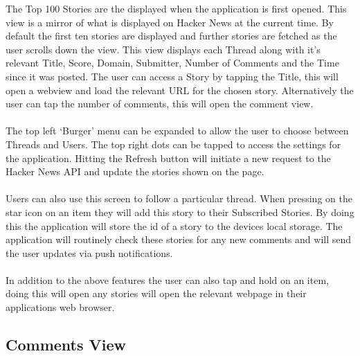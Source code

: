 \documentclass[11pt]{article}
\begin{document}
The Top 100 Stories are the displayed when the application is first opened. This view is a mirror of what is displayed on Hacker News at the current time. By default the first ten stories are displayed and further stories are fetched as the user scrolls down the view. This view displays each Thread along with it’s relevant Title, Score, Domain, Submitter, Number of Comments and the Time since it was posted. The user can access a Story by tapping the Title, this will open a webview and load the relevant URL for the chosen story. Alternatively the user can tap the number of comments, this will open the comment view.
\\
\\
The top left ‘Burger’ menu can be expanded to allow the user to choose between Threads and Users. The top right dots can be tapped to access the settings for the application. Hitting the Refresh button will initiate a new request to the Hacker News API and update the stories shown on the page.
\\
\\
Users can also use this screen to follow a particular thread. When pressing on the star icon on an item they will add this story to their Subscribed Stories. By doing this the application will store the id of a story to the devices local storage. The application will routinely check these stories for any new comments and will send the user updates via push notifications.
\\
\\
In addition to the above features the user can also tap and hold on an item, doing this will open any stories will open the relevant webpage in their applications web browser.

\subsection*{Comments View}
\end{document}
